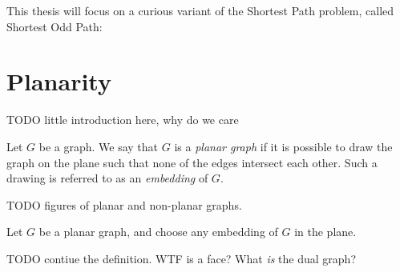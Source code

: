 
This thesis will focus on a curious variant of the Shortest Path problem, called Shortest Odd Path:


\section{Planarity}

TODO little introduction here, why do we care

\begin{definition}
    Let $G$ be a graph. We say that $G$ is a \emph{planar graph} if it is possible to draw the graph on the plane such that none of the edges intersect each other. Such a drawing is referred to as an \emph{embedding} of $G$.
\end{definition}

TODO figures of planar and non-planar graphs.

\begin{definition}
    Let $G$ be a planar graph, and choose any embedding of $G$ in the plane.
    
    
    TODO contiue the definition. WTF is a face?
    What \emph{is} the dual graph?
\end{definition}